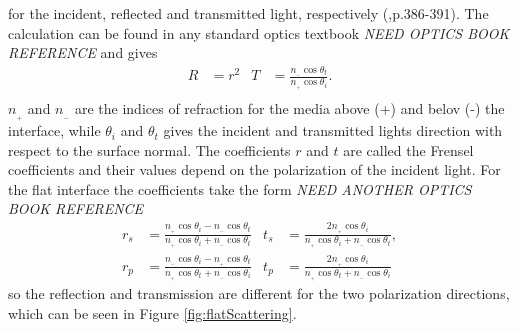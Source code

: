 for the incident, reflected and transmitted light, respectively (\cite{Griffiths},p.386-391).
The calculation can be found in any standard optics textbook \textit{NEED OPTICS BOOK REFERENCE}
and gives
\begin{align}
   R &= r^2       &T &= \frac{n\!_{_-} \cos \theta_t}{n\!_{_+} \cos \theta _i}. \label{refTransCoeffs2}\\
\end{align}
$n\!_{_+}$ and $n\!_{_-}$ are the indices of refraction for the media above (+) and belov (-) the interface,
while $\theta_i$ and $\theta_t$ gives the incident and transmitted lights direction with respect to the 
surface normal. 
The coefficients $r$ and $t$ are called the Frensel coefficients and their values depend on the
polarization of the incident light. For the flat interface the coefficients take the form
\textit{NEED ANOTHER OPTICS BOOK REFERENCE}
%
\begin{subequations}
\label{flatFresnelCoeff}
\begin{align}
   r_s &= \frac{n\!_{_+} \cos \theta_i - n\!_{_-} \cos \theta_t}
   {n\!_{_+} \cos \theta_i + n\!_{_-} \cos \theta_t}     
   &t_s &= \frac{2 n\!_{_+} \cos \theta_i}
   {n\!_{_+} \cos \theta_i + n\!_{_-} \cos \theta_t}, \label{flatFresnelCoeffs} \\
%
   r_p &= \frac{n\!_{_-} \cos \theta_i - n\!_{_+} \cos \theta_t}
   {n\!_{_+} \cos \theta_t + n\!_{_-} \cos \theta_i}     
   &t_p &= \frac{2 n\!_{_+} \cos \theta_i}
   {n\!_{_+} \cos \theta_t + n\!_{_-} \cos \theta_i}     \label{flatFresnelCoeffp}
\end{align}
\end{subequations}
%
so the reflection and transmission are different 
for the two polarization directions, which can be seen in Figure \ref{fig:flatScattering}.

